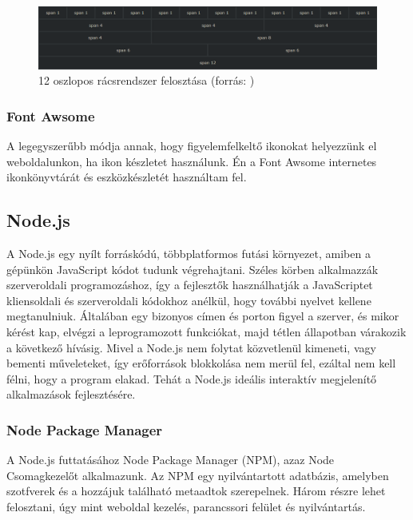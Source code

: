 \begin{figure}[h]
\centering
\includegraphics[scale=0.4]{images/gridSystem.png}
\caption{12 oszlopos rácsrendszer felosztása (forrás: \cite{gridSystem})}
\label{fig:gridSystem}
\end{figure}

\subsubsection{Font Awsome}

A legegyszerűbb módja annak, hogy figyelemfelkeltő ikonokat helyezzünk el weboldalunkon, ha ikon készletet használunk. Én a Font Awsome internetes ikonkönyvtárát és eszközkészletét használtam fel.

\subsection{Node.js}

A Node.js egy nyílt forráskódú, többplatformos futási környezet, amiben a gépünkön JavaScript kódot tudunk végrehajtani. Széles körben alkalmazzák szerveroldali programozáshoz, így a fejlesztők használhatják a JavaScriptet kliensoldali és szerveroldali kódokhoz anélkül, hogy további nyelvet kellene megtanulniuk. Általában egy bizonyos címen és porton figyel a szerver, és mikor kérést kap, elvégzi a leprogramozott funkciókat, majd tétlen állapotban várakozik a következő hívásig. Mivel a Node.js nem folytat közvetlenül kimeneti, vagy bementi műveleteket, így erőforrások blokkolása nem merül fel, ezáltal nem kell félni, hogy a program elakad. Tehát a Node.js ideális interaktív megjelenítő alkalmazások fejlesztésére. \cite{nodeJS}

\subsubsection{Node Package Manager}

A Node.js futtatásához Node Package Manager (NPM), azaz Node Csomagkezelőt alkalmazunk. Az NPM egy nyilvántartott adatbázis, amelyben szotfverek és a hozzájuk található metaadtok szerepelnek. Három részre lehet felosztani, úgy mint weboldal kezelés, parancssori felület és nyilvántartás.

